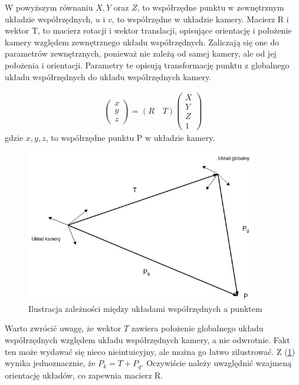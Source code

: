\documentclass[oneside, eng]{mgr}
\begin{document}
W powyższym równaniu $X, Y$ oraz $Z$, to współrzędne punktu w zewnętrznym układzie współrzędnych,
$u$ i $v$, to współrzędne w układzie kamery.
Macierz R i wektor T, to macierz rotacji i wektor translacji, opisujące orientację i położenie kamery względem zewnętrznego układu współrzędnych. Zaliczają się one do parametrów zewnętrznych, ponieważ nie zależą od samej kamery, ale od jej położenia i orientacji. Parametry te opisują transformację punktu z globalnego układu współrzędnych do układu współrzędnych kamery. 

\begin{align*}
	\left( \begin{array}{l} x \\ y \\ z \end{array} \right) =
	(R \quad T)
	\left( \begin{array}{l}
		X \\	Y \\	Z \\	1
	\end{array} \right) 
\end{align*}
gdzie $x, y, z$, to współrzędne punktu P w układzie kamery.


\begin{figure}
\centering
	\includegraphics[width=0.90\textwidth]{img/pinhole.jpg}\par\vspace{1cm}
\caption{Ilustracja zależności między układami współrzędnych a punktem}
	\label{fig:camera_coordinate_systems}
\end{figure}

Warto zwrócić uwagę, że wektor $T$ zawiera położenie globalnego układu współrzędnych względem układu współrzędnych kamery, a nie odwrotnie. Fakt ten może wydawać się nieco nieintuicyjny, ale można go łatwo zilustrować. Z (\ref{fig:camera_coordinate_systems}) wynika jednoznacznie, że $P_k = T + P_g$. Oczywiście należy uwzględnić wzajmeną orientację układów, co zapewnia macierz R.
\end{document}
